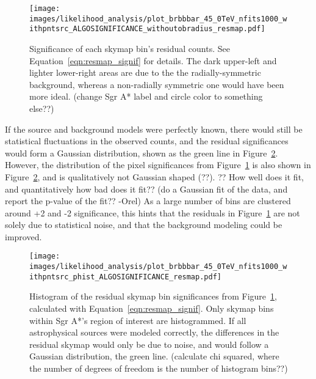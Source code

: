   \begin{figure}[ht]
    \centering
    \texttt{[image: images/likelihood\_analysis/plot\_brbbbar\_45\_0TeV\_nfits1000\_withpntsrc\_ALGOSIGNIFICANCE\_withoutobradius\_resmap.pdf]}
    \caption[Galactic Center Residual Map]
    {
      Significance of each skymap bin's residual counts.
      See Equation~\ref{eqn:resmap_signif} for details.
      The dark upper-left and lighter lower-right areas are due to the the radially-symmetric background, whereas a non-radially symmetric one would have been more ideal.
      {\color{red}(change Sgr A* label and circle color to something else??)}
    }
    \label{fig:gc_resmap}
  \end{figure}
  
  If the source and background models were perfectly known, there would still be statistical fluctuations in the observed counts, and the residual significances would form a Gaussian distribution, shown as the green line in Figure~\ref{fig:gc_resmap_sighist}.
  However, the distribution of the pixel significances from Figure~\ref{fig:gc_resmap} is also shown in Figure~\ref{fig:gc_resmap_sighist}, and is qualitatively not Gaussian shaped {\color{red}(??)}.
  {\color{red}?? How well does it fit, and quantitatively how bad does it fit??}
  {\color{red}(do a Gaussian fit of the data, and report the p-value of the fit?? -Orel)}
  As a large number of bins are clustered around +2 and -2 significance, this hints that the residuals in Figure~\ref{fig:gc_resmap} are not solely due to statistical noise, and that the background modeling could be improved.
  
  \begin{figure}[ht]
    \centering
    \texttt{[image: images/likelihood\_analysis/plot\_brbbbar\_45\_0TeV\_nfits1000\_withpntsrc\_phist\_ALGOSIGNIFICANCE\_resmap.pdf]}
    \caption[Galactic Center Residual Histogram]
    {
      Histogram of the residual skymap bin significances from Figure~\ref{fig:gc_resmap}, calculated with Equation~\ref{eqn:resmap_signif}.
      Only skymap bins within Sgr A*'s region of interest are histogrammed.
      If all astrophysical sources were modeled correctly, the differences in the residual skymap would only be due to noise, and would follow a Gaussian distribution, the green line.
      {\color{red}(calculate chi squared, where the number of degrees of freedom is the number of histogram bins??)}
    }
    \label{fig:gc_resmap_sighist}
  \end{figure}

